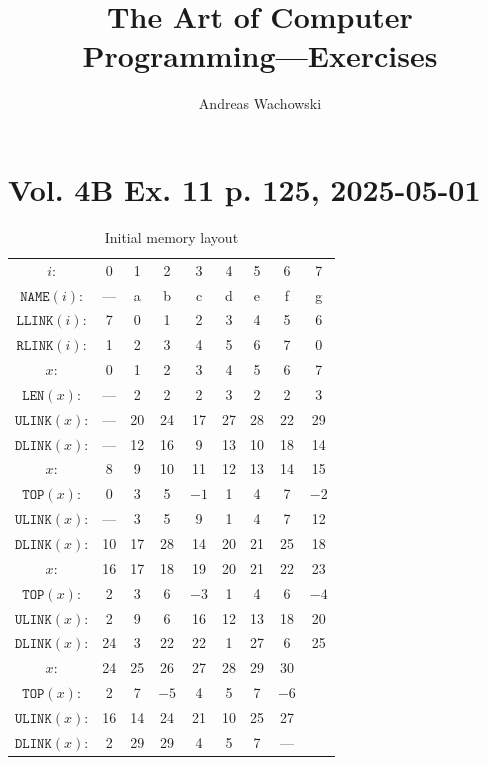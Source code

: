 \documentclass[a4paper,landscape,11pt]{article}
\title{The Art of Computer Programming---Exercises}
\author{Andreas Wachowski}
\date{}
\begin{document}
\maketitle

\thispagestyle{empty}
\tableofcontents
\listoffigures
\listoftables
\newpage
{}

\section{Vol. 4B Ex. 11 p. 125, 2025-05-01}

\begin{table}[h!]
	\begin{center}
		\caption{Initial memory layout}
		\begin{tabular}{c c c c c c c c c }
			\hline
			$i$:                 & 0   & 1  & 2    & 3    & 4  & 5  & 6    & 7    \\
			$\texttt{NAME}(i)$:  & --- & a  & b    & c    & d  & e  & f    & g    \\
			$\texttt{LLINK}(i)$: & 7   & 0  & 1    & 2    & 3  & 4  & 5    & 6    \\
			$\texttt{RLINK}(i)$: & 1   & 2  & 3    & 4    & 5  & 6  & 7    & 0    \\
			\hline
			$x$:                 & 0   & 1  & 2    & 3    & 4  & 5  & 6    & 7    \\
			$\texttt{LEN}(x)$:   & --- & 2  & 2    & 2    & 3  & 2  & 2    & 3    \\
			$\texttt{ULINK}(x)$: & --- & 20 & 24   & 17   & 27 & 28 & 22   & 29   \\
			$\texttt{DLINK}(x)$: & --- & 12 & 16   & 9    & 13 & 10 & 18   & 14   \\
			\hline
			$x$:                 & 8   & 9  & 10   & 11   & 12 & 13 & 14   & 15   \\
			$\texttt{TOP}(x)$:   & 0   & 3  & 5    & $-1$ & 1  & 4  & 7    & $-2$ \\
			$\texttt{ULINK}(x)$: & --- & 3  & 5    & 9    & 1  & 4  & 7    & 12   \\
			$\texttt{DLINK}(x)$: & 10  & 17 & 28   & 14   & 20 & 21 & 25   & 18   \\
			\hline
			$x$:                 & 16  & 17 & 18   & 19   & 20 & 21 & 22   & 23   \\
			$\texttt{TOP}(x)$:   & 2   & 3  & 6    & $-3$ & 1  & 4  & 6    & $-4$ \\
			$\texttt{ULINK}(x)$: & 2   & 9  & 6    & 16   & 12 & 13 & 18   & 20   \\
			$\texttt{DLINK}(x)$: & 24  & 3  & 22   & 22   & 1  & 27 & 6    & 25   \\
			\hline
			$x$:                 & 24  & 25 & 26   & 27   & 28 & 29 & 30   &      \\
			$\texttt{TOP}(x)$:   & 2   & 7  & $-5$ & 4    & 5  & 7  & $-6$ &      \\
			$\texttt{ULINK}(x)$: & 16  & 14 & 24   & 21   & 10 & 25 & 27   &      \\
			$\texttt{DLINK}(x)$: & 2   & 29 & 29   & 4    & 5  & 7  & ---  &      \\
		\end{tabular}
	\end{center}
\end{table}
\end{document}
